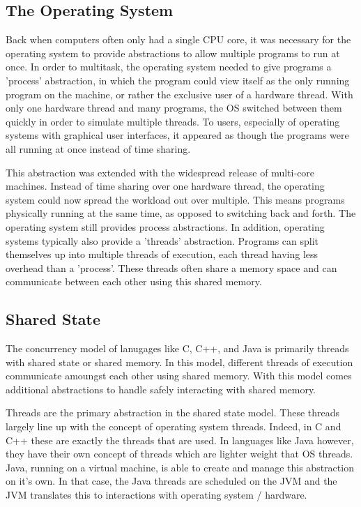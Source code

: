 \documentclass{article}
\begin{document}
\subsection{The Operating System}
Back when computers often only had a single CPU core, it was necessary for the
operating system to provide abstractions to allow multiple programs to run at
once. In order to multitask, the operating system needed to give programs a
'process' abstraction, in which the program could view itself as the only
running program on the machine, or rather the exclusive user of a hardware
thread. With only one hardware thread and many programs, the OS switched between
them quickly in order to simulate multiple threads. To users, especially of
operating systems with graphical user interfaces, it appeared as though the
programs were all running at once instead of time sharing.

This abstraction was extended with the widespread release of multi-core
machines. Instead of time sharing over one hardware thread, the operating system
could now spread the workload out over multiple. This means programs physically
running at the same time, as opposed to switching back and forth. The operating
system still provides process abstractions. In addition, operating systems
typically also provide a 'threads' abstraction. Programs can split themselves up
into multiple threads of execution, each thread having less overhead than a
'process'. These threads often share a memory space and can communicate between
each other using this shared memory.

\subsection{Shared State}
The concurrency model of lanugages like C, C++, and Java is primarily threads with
shared state or shared memory. In this model, different threads of execution communicate
amoungst each other using shared memory. With this model comes additional abstractions
to handle safely interacting with shared memory.

Threads are the primary abstraction in the shared state model. These threads
largely line up with the concept of operating system threads. Indeed, in C and
C++ these are exactly the threads that are used. In languages like Java however,
they have their own concept of threads which are lighter weight that OS threads.
Java, running on a virtual machine, is able to create and manage this
abstraction on it's own. In that case, the Java threads are scheduled on the JVM
and the JVM translates this to interactions with operating system / hardware.
\end{document}
